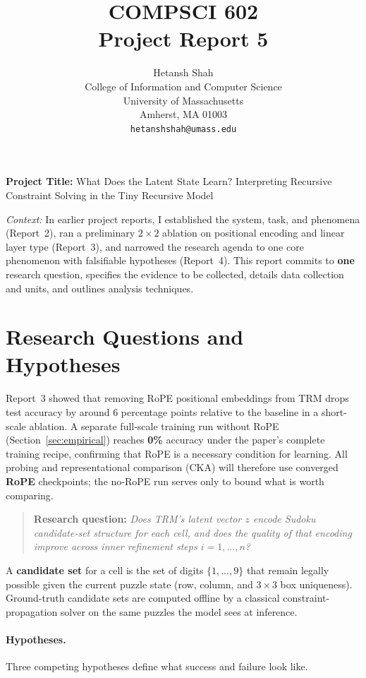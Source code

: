 \documentclass{article}
\title{COMPSCI 602 \\ Project Report 5}
\author{%
  Hetansh Shah\\
  College of Information and Computer Science\\
  University of Massachusetts\\
  Amherst, MA 01003 \\
  \texttt{hetanshshah@umass.edu} \\
}
\begin{document}
\maketitle

\textbf{Project Title:} What Does the Latent State Learn? Interpreting Recursive Constraint Solving in the Tiny Recursive Model~\cite{jolicoeur2025}

\smallskip
\noindent\textit{Context:} In earlier project reports, I established the system, task, and phenomena (Report~2), ran a preliminary $2 \times 2$ ablation on positional encoding and linear layer type (Report~3), and narrowed the research agenda to one core phenomenon with falsifiable hypotheses (Report~4).  This report commits to \textbf{one} research question, specifies the evidence to be collected, details data collection and units, and outlines analysis techniques.

\section{Research Questions and Hypotheses}

Report~3 showed that removing RoPE positional embeddings from TRM drops test accuracy by around 6 percentage points relative to the baseline in a short-scale ablation.  A separate full-scale training run without RoPE (Section~\ref{sec:empirical}) reaches \textbf{0\%} accuracy under the paper's complete training recipe, confirming that RoPE is a necessary condition for learning.  All probing and representational comparison (CKA) will therefore use converged \textbf{RoPE} checkpoints; the no-RoPE run serves only to bound what is worth comparing.

\begin{quote}
\textbf{Research question:} \textit{Does TRM's latent vector $z$ encode Sudoku candidate-set structure for each cell, and does the quality of that encoding improve across inner refinement steps $i = 1, \ldots, n$?}
\end{quote}

\noindent A \textbf{candidate set} for a cell is the set of digits $\{1,\ldots,9\}$ that remain legally possible given the current puzzle state (row, column, and $3 \times 3$ box uniqueness).  Ground-truth candidate sets are computed offline by a classical constraint-propagation solver on the same puzzles the model sees at inference.

\paragraph{Hypotheses.}  Three competing hypotheses define what success and failure look like.
\end{document}
